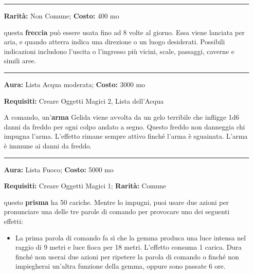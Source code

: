 \begin{multicols}{2}
\smallskip\noindent\rule{\linewidth}{2pt}  \hypertarget{Freccialocalizzante}{}\medskip{}\noindent\label{Freccialocalizzante}

\textbf{Rarità:} Non Comune; \textbf{Costo:} 400 mo

questa \textbf{freccia} può essere usata fino ad 8 volte al giorno. Essa viene lanciata per aria, e quando atterra indica una direzione o un luogo desiderati. Possibili indicazioni includono l'uscita o l'ingresso più vicini, scale, passaggi, caverne e simili aree.

\smallskip\noindent\rule{\linewidth}{2pt}  \hypertarget{Gelida}{}\medskip{}\noindent\label{Gelida}

\textbf{Aura:} Lista Acqua moderata; \textbf{Costo:} 3000 mo

\textbf{Requisiti:} Creare Oggetti Magici 2, Lista dell'Acqua

A comando, un'\textbf{arma} Gelida viene avvolta da un gelo terribile che infligge 1d6 danni da freddo per ogni colpo andato a segno. Questo freddo non danneggia chi impugna l'arma. L'effetto rimane sempre attivo finché l'arma è sguainata. L'arma è immune ai danni da freddo.

\smallskip\noindent\rule{\linewidth}{2pt}  \hypertarget{GemmadellaLuminosità}{}\medskip{}\noindent\label{GemmadellaLuminosità}

\textbf{Aura:} Lista Fuoco; \textbf{Costo:} 5000 mo

\textbf{Requisiti:} Creare Oggetti Magici 1; \textbf{Rarità:} Comune

questo \textbf{prisma} ha 50 cariche. Mentre lo impugni, puoi usare due azioni per pronunciare una delle tre parole di comando per provocare uno dei seguenti effetti:

\begin{itemize}[leftmargin=*] \setlength{\itemsep}{0pt}
\item
La prima parola di comando fa sì che la gemma produca una luce intensa nel raggio di 9 metri e luce fioca per 18 metri. L'effetto consuma 1 carica. Dura finché non userai due azioni per ripetere la parola di comando o finché non impiegherai un'altra funzione della gemma, oppure sono passate 6 ore.


\end{itemize}
\end{multicols}
